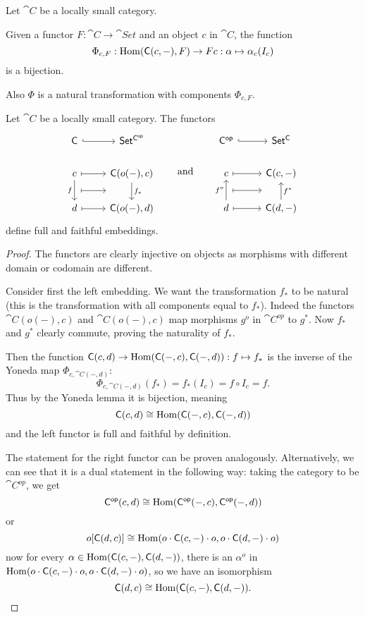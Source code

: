 \begin{theorem} \label{YonedaLemma}
Let $\cat{C}$ be a locally small category.

Given a functor $F: \cat{C} \to \cat{Set}$ and an object $c$ in $\cat{C}$, the function
\[ \Phi_{c,F}: \operatorname{Hom}(\mathsf{C}(c,-), F) \to Fc: \alpha \mapsto \alpha_c(I_c) \]
is a bijection.

Also $\Phi$ is a natural transformation with components $\Phi_{c,F}$.
\end{theorem}
\begin{corollary} \label{YonedaEmbedding}
Let $\cat{C}$ be a locally small category. The functors
\[ \begin{tikzcd}
\cat{C} \ar[r, hook] & \cat{Set^{C^{op}}} \\
c \ar[d, swap, "f"]\ar[r, mapsto] \ar[r,mapsto, shift right=1.7em] & \cat{C}(o(-),c) \ar[d, "f_*"] \\
d \ar[r,mapsto] & \cat{C}(o(-),d)
\end{tikzcd} \qquad\text{and}\qquad \begin{tikzcd}
\cat{C^{op}} \ar[r, hook] & \cat{Set^C} \\
c \ar[r, mapsto] \ar[r,mapsto, shift right=1.7em] & \cat{C}(c,-) \\
d \ar[u, "f^o"] \ar[r,mapsto] & \cat{C}(d,-) \ar[u, swap, "f^*"]
\end{tikzcd} \]
define full and faithful embeddings.
\end{corollary}
\begin{proof}
The functors are clearly injective on objects as morphisms with different domain or codomain are different.

Consider first the left embedding. We want the transformation $f_*$ to be natural (this is the transformation with all components equal to $f_*$). Indeed the functors $\cat{C}(o(-),c)$ and $\cat{C}(o(-),c)$ map morphisms $g^o$ in $\cat{C^{op}}$ to $g^*$. Now $f_*$ and $g^*$ clearly commute, proving the naturality of $f_*$.

Then the function $\mathsf{C}(c,d) \to \operatorname{Hom}(\mathsf{C}(-,c),\mathsf{C}(-,d)): f\mapsto f_*$ is the inverse of the Yoneda map $\Phi_{c,\cat{C}(-,d)}$:
\[ \Phi_{c,\cat{C}(-,d)}(f_*) = f_*(I_c) = f\circ I_c = f. \]
Thus by the Yoneda lemma it is bijection, meaning
\[ \mathsf{C}(c,d) \cong \operatorname{Hom}(\mathsf{C}(-,c),\mathsf{C}(-,d)) \]
and the left functor is full and faithful by definition.

The statement for the right functor can be proven analogously. Alternatively, we can see that it is a dual statement in the following way: taking the category to be $\cat{C^{op}}$, we get
\[ \mathsf{C^{op}}(c,d) \cong \operatorname{Hom}(\mathsf{C^{op}}(-,c),\mathsf{C^{op}}(-,d)) \]
or
\[ o[\mathsf{C}(d,c)] \cong \operatorname{Hom}(o\cdot\mathsf{C}(c,-)\cdot o,o\cdot\mathsf{C}(d,-)\cdot o) \]
now for every $\alpha \in \operatorname{Hom}(\mathsf{C}(c,-),\mathsf{C}(d,-))$, there is an $\alpha^o$ in $\operatorname{Hom}(o\cdot\mathsf{C}(c,-)\cdot o,o\cdot\mathsf{C}(d,-)\cdot o)$, so we have an isomorphism
\[ \mathsf{C}(d,c) \cong \operatorname{Hom}(\mathsf{C}(c,-),\mathsf{C}(d,-)). \]
\end{proof}

